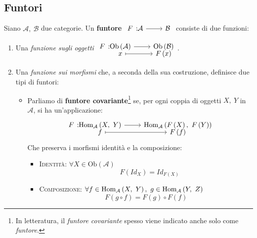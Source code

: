 \subsection{Funtori} 
\begin{define}
Siano $\mathcal{A},\ \mathcal{B}$ due categorie. Un \textbf{funtore} $\funz{F}{\mathcal{A}}{\mathcal{B}}$ consiste di due funzioni:
\begin{enumerate}
	\item Una \textit{funzione sugli oggetti} $\funztot{F}{\mathrm{Ob}\left(\mathcal{A}\right)}{\mathrm{Ob}\left(\mathcal{B}\right)}{x}{F\left(x\right)}$.
	\item Una \textit{funzione sui morfismi} che, a seconda della sua costruzione, definisce due tipi di funtori:
	\begin{itemize}
		\item Parliamo di \textbf{funtore covariante}\footnote{In letteratura, il \textit{funtore covariante} spesso viene indicato anche solo come \textit{funtore}.} se, per ogni coppia di oggetti $X,\ Y$ in $\mathcal{A}$, si ha un'applicazione:
		\begin{equation}
			\funztot{F}{\homo{\mathcal{A}}{X}{Y}}{\homo{\mathcal{A}}{F\left(X\right)}{F\left(Y\right)}}{f}{F\left(f\right)}
		\end{equation}
	Che preserva i morfismi identità e la composizione:
	\begin{itemize}
		\item \textsc{Identità}: $\forall X\in \mathrm{Ob}\left(\mathcal{A}\right)$
		\begin{equation}
			\quad F\left(Id_X\right)=Id_{F\left(X\right)}
		\end{equation}
		\item \textsc{Composizione}: $\forall f\in\homo{\mathcal{A}}{X}{Y},\ g\in\homo{\mathcal{A}}{Y}{Z}$
		\begin{equation}
			F\left(g\circ f\right)=F\left(g\right)\circ F\left(f\right)
		\end{equation}
	\end{itemize}
	\begin{center}
\end{center}
\end{itemize}
\end{enumerate}
\end{define}
